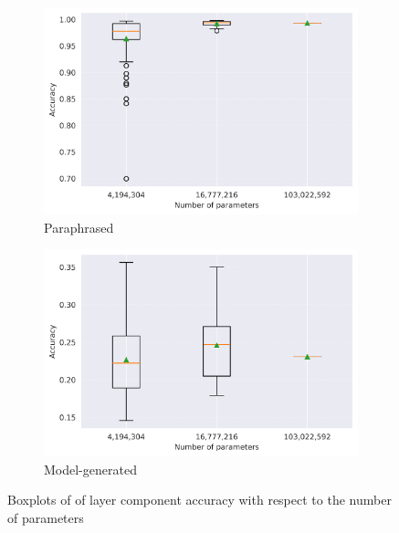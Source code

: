 \begin{figure}[h]
    \centering
    \begin{subfigure}[h]{0.495\textwidth}
        \centering
        \includegraphics[width=\textwidth]{figures/results/paraphrased/accuracy_per_layer_boxplot.png}
        \caption{Paraphrased}
        \label{fig:accuracy_per_layer_boxplot_paraphrased}
    \end{subfigure}
    \hfill
    \begin{subfigure}[h]{0.495\textwidth}
        \centering
        \includegraphics[width=\textwidth]{figures/results/model-generated/accuracy_per_layer_boxplot.png}
        \caption{Model-generated}
        \label{fig:accuracy_per_layer_boxplot_model_generated}
    \end{subfigure}
    \caption{Boxplots of of layer component accuracy with respect to the number of parameters}
    \label{fig:accuracy_per_layer_boxplot}
\end{figure}

